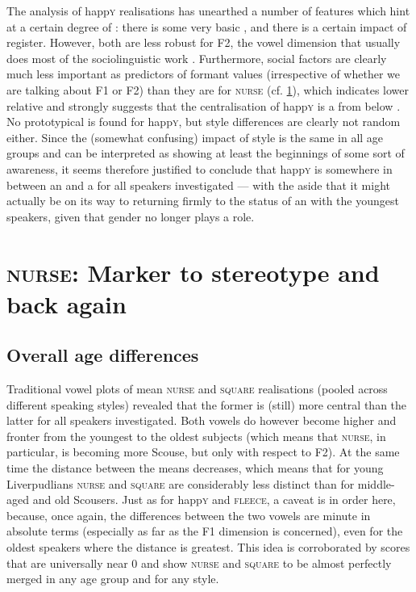The analysis of happ\textsc{y} realisations has unearthed a number of features which hint at a certain degree of : there is some very basic , and there is a certain impact of register.
However, both are less robust for F2, the vowel dimension that usually does most of the sociolinguistic work \parencite[cf.][502]{labov2006a}.
Furthermore, social factors are clearly much less important as predictors of formant values (irrespective of whether we are talking about F1 or F2) than they are for \textsc{nurse} (cf. \ref{prod.disc.nurse}), which indicates lower relative  and strongly suggests that the centralisation of happ\textsc{y} is a  from below \parencite[cf.][78]{labov1994}.
No prototypical  is found for happ\textsc{y}, but style differences are clearly not random either.
Since the (somewhat confusing) impact of style is the same in all age groups and can be interpreted as showing at least the beginnings of some sort of awareness, it seems therefore justified to conclude that happ\textsc{y} is somewhere in between an  and a  for all speakers investigated --- with the aside that it might actually be on its way to returning firmly to the status of an  with the youngest speakers, given that gender no longer plays a role.

\section{\textrm{\textsc{nurse}}: Marker to stereotype and back again}
\label{prod.disc.nurse}

\subsection{Overall age differences}
\label{prod.disc.nurse.age}

Traditional vowel plots of mean \textsc{nurse} and \textsc{square} realisations (pooled across different speaking styles) revealed that the former is (still) more central than the latter for all speakers investigated.
Both vowels do however become higher and fronter from the youngest to the oldest subjects (which means that \textsc{nurse}, in particular, is becoming more Scouse, but only with respect to F2).
At the same time the distance between the means decreases, which means that for young Liverpudlians \textsc{nurse} and \textsc{square} are considerably less distinct than for middle-aged and old Scousers.
Just as for happ\textsc{y} and \textsc{fleece}, a caveat is in order here, because, once again, the differences between the two vowels are minute in absolute terms (especially as far as the F1 dimension is concerned), even for the oldest speakers where the distance is greatest.
This idea is corroborated by  scores that are universally near 0 and show \textsc{nurse} and \textsc{square} to be almost perfectly merged in any age group and for any style.

